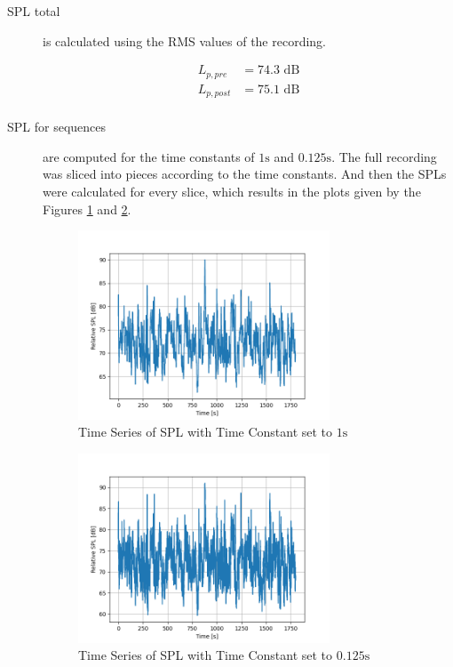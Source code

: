 \documentclass[twocolumn]{article}
\begin{document}
\begin{description}
\item[SPL total] is calculated using the RMS values of the recording.

\begin{equation}
\begin{aligned}
    L_{p,pre} & = 74.3 \textrm{ dB} \\
    L_{p,post} & = 75.1 \textrm{ dB} \\
\end{aligned}
\end{equation}

\item[SPL for sequences] are computed for the time constants of $1\textrm{s}$ and $0.125\textrm{s}$.
    The full recording was sliced into pieces according to the time constants.
    And then the SPLs were calculated for every slice, which results in the plots given by the Figures
    \ref{fig:time_constant_1s} and \ref{fig:time_constant_125ms}.

\begin{figure}[H]
    \centering
    \includegraphics[width=75mm]{./Images/time_constant_spl_1s.png}
    \caption{Time Series of SPL with Time Constant set to $1\textrm{s}$}
    \label{fig:time_constant_1s}
\end{figure}

\begin{figure}[H]
    \centering
    \includegraphics[width=75mm]{./Images/time_constant_spl_125ms.png}
    \caption{Time Series of SPL with Time Constant set to $0.125\textrm{s}$}
    \label{fig:time_constant_125ms}
\end{figure}


\end{description}
\end{document}
